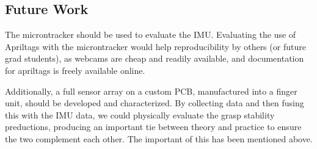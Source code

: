 \documentclass[12pt]{article}
\begin{document}

%
%

\subsection{Future Work}

The microntracker should be used to evaluate the IMU. Evaluating the use of Apriltags with the
microntracker would help reproducibility by others (or future grad students), as webcams are cheap
and readily available, and documentation for apriltags is freely available online.

Additionally, a full sensor array on a custom PCB, manufactured into a finger unit, should be
developed and characterized. By collecting data and then fusing this with the IMU data, we could
physically evaluate the grasp stability preductions, producing an important tie between theory and
practice to ensure the two complement each other. The important of this has been mentioned above.
\end{document}
